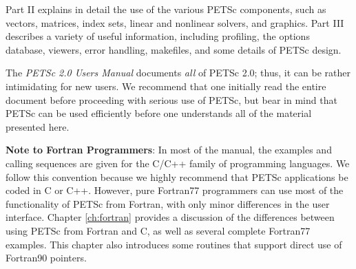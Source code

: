 Part II explains in detail the use of the various PETSc components,
such as vectors, matrices, index sets, linear and nonlinear
solvers, and graphics.  Part III describes a variety of useful
information, including profiling, the options database, viewers, error
handling, makefiles, and some details of
PETSc design.

\nocite{efficient}

The {\em PETSc 2.0 Users Manual} documents {\em all} of PETSc 2.0; thus,
it can be rather intimidating for new users. We recommend that one initially
read the entire document before proceeding with serious use of PETSc,
but bear in mind that PETSc can be used efficiently
before one understands all of the material presented here. 

\medskip \medskip

{\bf Note to Fortran Programmers}: In most of the  
manual, the examples and calling sequences are given for the C/C++
family of programming languages.  We follow this convention because we
highly recommend that PETSc applications be coded in C or C++.
However, pure Fortran77 programmers can use most of the
functionality of PETSc from Fortran, with only minor differences in
the user interface.  Chapter \ref{ch:fortran} provides a discussion of the
differences between using PETSc from Fortran and C, as well as several
complete Fortran77 examples.  This chapter also introduces some
routines that support direct use of Fortran90 pointers.

\medskip \medskip

